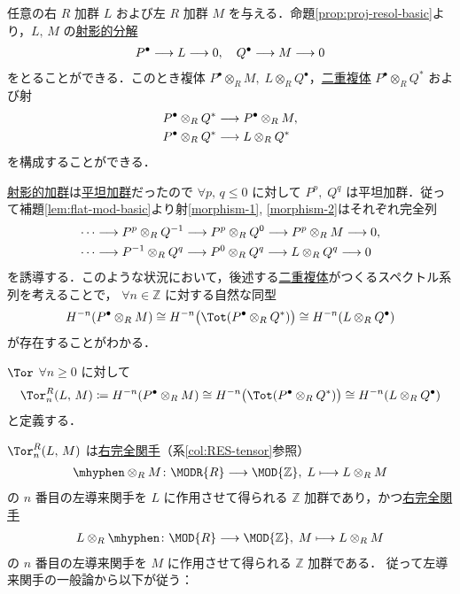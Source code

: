 \documentclass[algtopo_main]{subfiles}
\begin{document}
任意の右 $R$ 加群 $L$ および左 $R$ 加群 $M$ を与える．命題\ref{prop:proj-resol-basic}より，$L,\, M$ の\hyperref[def:projective-resolution]{射影的分解}
\begin{align}
    P^\bullet \longrightarrow L \longrightarrow 0,\quad Q^\bullet \longrightarrow M \longrightarrow 0
\end{align}
をとることができる．このとき複体 $P^\bullet \otimes_R M,\; L \otimes_R Q^\bullet$，\hyperref[def:double-complex]{二重複体} $P^\bullet \otimes_R Q^*$ および射
\begin{align}
    &P^\bullet \otimes_R Q^* \longrightarrow P^\bullet \otimes_R M,\label{morphism-1} \\
    &P^\bullet \otimes_R Q^* \longrightarrow L \otimes_R Q^* \label{morphism-2}
\end{align}
を構成することができる．

\hyperref[def:proj-mod]{射影的加群}は\hyperref[def:flat-mod]{平坦加群}だったので $\forall p,\, q \le 0$ に対して $P^p,\; Q^q$ は平坦加群．従って補題\ref{lem:flat-mod-basic}より射\eqref{morphism-1}, \eqref{morphism-2}はそれぞれ完全列
\begin{align}
    \cdots &\longrightarrow P^p \otimes_R Q^{-1} \longrightarrow P^p \otimes_R Q^0 \longrightarrow P^p \otimes_R M \longrightarrow 0,\\
    \cdots &\longrightarrow P^{-1} \otimes_R Q^{q} \longrightarrow P^0 \otimes_R Q^q \longrightarrow L \otimes_R Q^q \longrightarrow 0
\end{align}
を誘導する．このような状況において，後述する\hyperref[def:double-complex]{二重複体}がつくるスペクトル系列を考えることで， 
$\forall n \in \mathbb{Z}$ に対する自然な同型
\begin{align}
    \label{eq:spectral-isom-Tor}
    H^{-n}(P^\bullet \otimes_R M) \cong H^{-n} \bigl( \Tot(P^\bullet \otimes_R Q^*) \bigr) \cong H^{-n} (L \otimes_R Q^\bullet)
\end{align}
が存在することがわかる．

\begin{mydef}[label=def:Tor]{$\Tor$}
    $\forall n \ge 0$ に対して
    \begin{align}
        \Tor^R_n (L,\, M) \coloneqq H^{-n}(P^\bullet \otimes_R M) \cong H^{-n} \bigl( \Tot(P^\bullet \otimes_R Q^*) \bigr) \cong H^{-n} (L \otimes_R Q^\bullet)
    \end{align}
    と定義する．
\end{mydef}


$\Tor^R_n(L,\, M)$ は\hyperref[def:Ab-func]{右完全関手}（系\ref{col:RES-tensor}参照）
\begin{align}
    \mhyphen \otimes_R M \colon \MODR{R} \lto \MOD{\mathbb{Z}},\; L \lmto L \otimes_R M
\end{align}
の $n$ 番目の左導来関手を $L$ に作用させて得られる $\mathbb{Z}$ 加群であり，かつ\hyperref[def:Ab-func]{右完全関手}
\begin{align}
    L \otimes_R \mhyphen \colon \MOD{R} \lto \MOD{\mathbb{Z}},\; M \lmto L \otimes_R M
\end{align}
の $n$ 番目の左導来関手を $M$ に作用させて得られる $\mathbb{Z}$ 加群である．
従って左導来関手の一般論から以下が従う：
\end{document}
